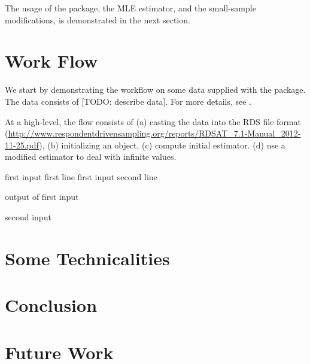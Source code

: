 \documentclass[article]{jss}
\begin{document}
The usage of the package, the MLE estimator, and the small-sample modifications, is demonstrated in the next section.



\section{Work Flow}

We start by demonstrating the workflow on some data supplied with the package. 
The data consists of [TODO: describe data].
For more details, see \citet{salganik_assessing_2011}. 

At a high-level, the flow consists of (a) casting the data into the RDS file format (\url{http://www.respondentdrivensampling.org/reports/RDSAT_7.1-Manual_2012-11-25.pdf}), 
(b) initializing an  object, 
(c) compute initial estimator.
(d) use a modified estimator to deal with infinite values. 


\begin{CodeChunk}
\begin{CodeInput}
first input first line
first input second line
\end{CodeInput}
\begin{CodeOutput}
output of first input
\end{CodeOutput}
\begin{CodeInput}
second input
\end{CodeInput}
\end{CodeChunk}




\section{Some Technicalities}


\section{Conclusion}


\section{Future Work}




\end{document}
